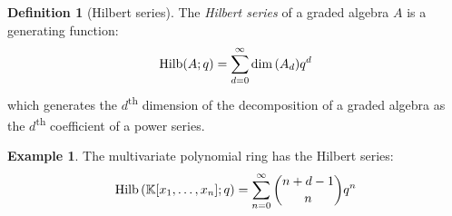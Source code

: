 \documentclass{article}
\theoremstyle{definition}
\newtheorem{Definition}{Definition}
\newtheorem*{Example*}{Example}
\theoremstyle{remark}
\theoremstyle{underline}
\theoremstyle{underline}
\DeclareMathOperator{\Hilb}{Hilb}
\renewcommand{\th}{\textsuperscript{th}\xspace}
\begin{document}
	\begin{Definition}[Hilbert series]
		The \emph{Hilbert series} of a graded algebra $A$ is a generating function:
		\begin{gather*}
			\Hilb(A; q) = \sum_{d=0}^{\infty} \dim\pqty{A_d} q^d
		\end{gather*}
		which generates the $d$\th dimension of the decomposition of a graded algebra as the $d$\th coefficient of a power series.
	\end{Definition}

	\begin{Example*}
		The multivariate polynomial ring has the Hilbert series:
		\begin{gather*}
			\Hilb\pqty{\mathbb K[x_1,\ldots, x_n]; q} = \sum_{n=0}^{\infty} \binom{n + d - 1}{n} q^n
		\end{gather*}
	\end{Example*}
\end{document}
